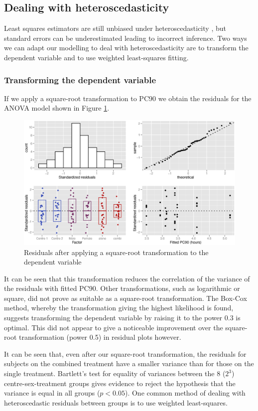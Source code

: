 \subsection{Dealing with heteroscedasticity}
Least squares estimators are still unbiased under heteroscedasticity \cite{long}, but standard errors can be underestimated leading to incorrect inference. Two ways we can adapt our modelling to deal with heteroscedasticity are to transform the dependent variable and to use weighted least-squares fitting.

\subsubsection*{Transforming the dependent variable}
If we apply a square-root transformation to PC90 we obtain the residuals for the ANOVA model shown in Figure \ref{aovsqrtres}.
\begin{figure}[h]
\includegraphics[width=150mm]{aovsqrtres.eps} 
\caption{Residuals after applying a square-root transformation to the dependent variable}
\label{aovsqrtres}
\end{figure}
It can be seen that this transformation reduces the correlation of the variance of the residuals with fitted PC90. Other transformations, such as logarithmic or square, did not prove as suitable as a square-root transformation. The Box-Cox method, whereby the transformation giving the highest likelihood is found, suggests transforming the dependent variable by raising it to the power 0.3 is optimal. This did not appear to give a noticeable improvement over the square-root transformation (power 0.5) in residual plots however.

It can be seen that, even after our square-root transformation, the residuals for subjects on the combined treatment have a smaller variance than for those on the single treatment. Bartlett's test for equality of variances \cite{montgomery} between the 8 ($2^{3}$) centre-sex-treatment groups gives evidence to reject the hypothesis that the variance is equal in all groups ($p<0.05$).  One common method of dealing with heteroscedastic residuals between groups is to use weighted least-squares.

